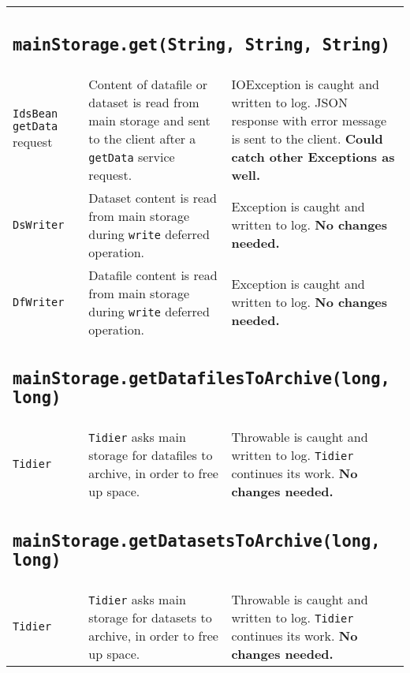 \documentclass[paper=a4]{scrartcl}
\begin{document}
\begin{longtable}{ p{32mm} | p{48mm} | p{48mm} }
    \multicolumn{3}{p{\textwidth}}{
      \subsection{\texttt{mainStorage.get(String, String, String)}}
    } \\

    \raggedright \texttt{IdsBean} \texttt{getData} request &
    \raggedright Content of datafile or dataset is read from main storage and sent to the client after a \texttt{getData} service request. &
    \raggedright IOException is caught and written to log. JSON response with error message is sent to the client. \textbf{Could catch other Exceptions as well.}
    \tabularnewline[4mm]
    \raggedright \texttt{DsWriter} &
    \raggedright Dataset content is read from main storage during \texttt{write} deferred operation. &
    \raggedright Exception is caught and written to log. \textbf{No changes needed.}
    \tabularnewline[4mm]
    \raggedright \texttt{DfWriter} &
    \raggedright Datafile content is read from main storage during \texttt{write} deferred operation. &
    \raggedright Exception is caught and written to log. \textbf{No changes needed.}
    \tabularnewline

    \multicolumn{3}{p{\textwidth}}{
      \subsection{\texttt{mainStorage.getDatafilesToArchive(long, long)}}
    } \\

    \texttt{Tidier} &
    \raggedright \texttt{Tidier} asks main storage for datafiles to archive, in order to free up space. &
    \raggedright Throwable is caught and written to log. \texttt{Tidier} continues its work. \textbf{No changes needed.}
    \tabularnewline

    \multicolumn{3}{p{\textwidth}}{
      \subsection{\texttt{mainStorage.getDatasetsToArchive(long, long)}}
    } \\

    \texttt{Tidier} &
    \raggedright \texttt{Tidier} asks main storage for datasets to archive, in order to free up space. &
    \raggedright Throwable is caught and written to log. \texttt{Tidier} continues its work. \textbf{No changes needed.}
    \tabularnewline


\end{longtable}
\end{document}
